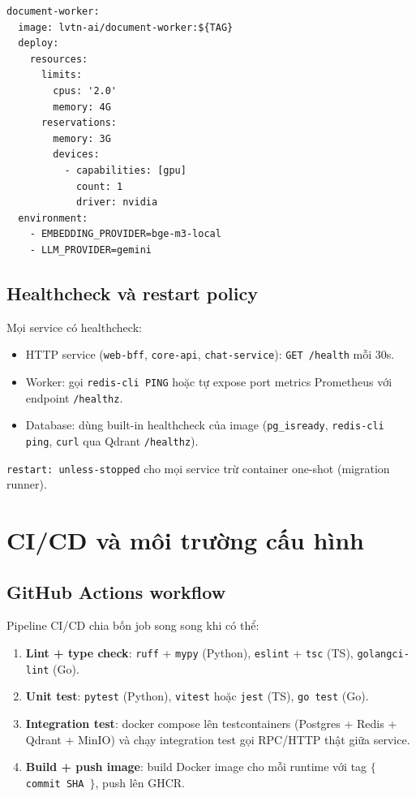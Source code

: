 \begin{lstlisting}[caption={Resource limit cho \texttt{document-worker}.}]
document-worker:
  image: lvtn-ai/document-worker:${TAG}
  deploy:
    resources:
      limits:
        cpus: '2.0'
        memory: 4G
      reservations:
        memory: 3G
        devices:
          - capabilities: [gpu]
            count: 1
            driver: nvidia
  environment:
    - EMBEDDING_PROVIDER=bge-m3-local
    - LLM_PROVIDER=gemini
\end{lstlisting}

\subsection{Healthcheck và restart policy}

Mọi service có healthcheck:

\begin{itemize}
    \item HTTP service (\texttt{web-bff}, \texttt{core-api},
          \texttt{chat-service}): \texttt{GET /health} mỗi 30s.
    \item Worker: gọi \texttt{redis-cli PING} hoặc tự expose port
          metrics Prometheus với endpoint \texttt{/healthz}.
    \item Database: dùng built-in healthcheck của image
          (\texttt{pg\_isready}, \texttt{redis-cli ping},
          \texttt{curl} qua Qdrant \texttt{/healthz}).
\end{itemize}

\texttt{restart: unless-stopped} cho mọi service trừ container
one-shot (migration runner).

\section{CI/CD và môi trường cấu hình}
\label{sec:cicd-impl}

\subsection{GitHub Actions workflow}

Pipeline CI/CD chia bốn job song song khi có thể:

\begin{enumerate}
    \item \textbf{Lint + type check}: \texttt{ruff} + \texttt{mypy}
          (Python), \texttt{eslint} + \texttt{tsc} (TS),
          \texttt{golangci-lint} (Go).
    \item \textbf{Unit test}: \texttt{pytest} (Python),
          \texttt{vitest} hoặc \texttt{jest} (TS),
          \texttt{go test} (Go).
    \item \textbf{Integration test}: docker compose lên testcontainers
          (Postgres + Redis + Qdrant + MinIO) và chạy integration test
          gọi RPC/HTTP thật giữa service.
    \item \textbf{Build + push image}: build Docker image cho mỗi
          runtime với tag \texttt{$\{$ commit SHA $\}$}, push lên GHCR.
\end{enumerate}


